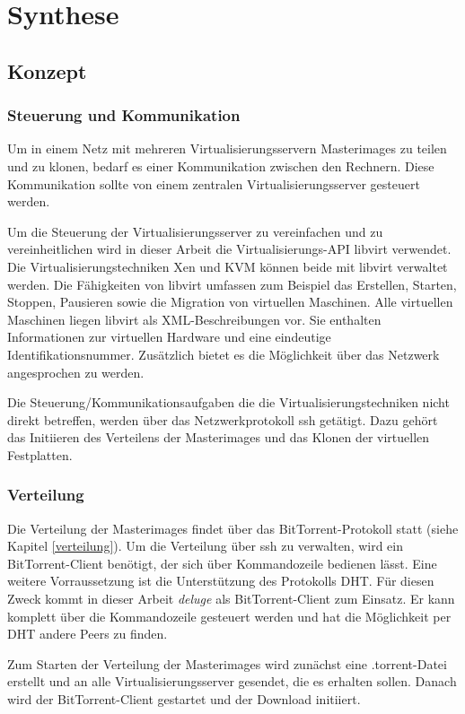 \chapter{Synthese}
\section{Konzept}
\subsection{Steuerung und Kommunikation}
Um in einem Netz mit mehreren Virtualisierungsservern Masterimages zu teilen und zu klonen, bedarf es einer Kommunikation zwischen den Rechnern. Diese Kommunikation sollte von einem zentralen Virtualisierungsserver gesteuert werden.

Um die Steuerung der Virtualisierungsserver zu vereinfachen und zu vereinheitlichen wird in dieser Arbeit die Virtualisierungs-API libvirt verwendet. Die Virtualisierungstechniken Xen und KVM können beide mit libvirt verwaltet werden. Die Fähigkeiten von libvirt umfassen zum Beispiel das Erstellen, Starten, Stoppen, Pausieren sowie die Migration von virtuellen Maschinen. Alle virtuellen Maschinen liegen libvirt als XML-Beschreibungen vor. Sie enthalten Informationen zur virtuellen Hardware und eine eindeutige Identifikationsnummer. Zusätzlich bietet es die Möglichkeit über das Netzwerk angesprochen zu werden.

Die Steuerung/Kommunikationsaufgaben die die Virtualisierungstechniken nicht direkt betreffen, werden über das Netzwerkprotokoll ssh getätigt. Dazu gehört das Initiieren des Verteilens der Masterimages und das Klonen der virtuellen Festplatten.

\subsection{Verteilung}
Die Verteilung der Masterimages findet über das BitTorrent-Protokoll statt (siehe Kapitel \ref{verteilung}). Um die Verteilung über ssh zu verwalten, wird ein BitTorrent-Client benötigt, der sich über Kommandozeile bedienen lässt. Eine weitere Vorraussetzung ist die Unterstützung des Protokolls DHT. Für diesen Zweck kommt in dieser Arbeit \textit{deluge} als BitTorrent-Client zum Einsatz. Er kann komplett über die Kommandozeile gesteuert werden und hat die Möglichkeit per DHT andere Peers zu finden.

Zum Starten der Verteilung der Masterimages wird zunächst eine .torrent-Datei erstellt und an alle Virtualisierungsserver gesendet, die es erhalten sollen. Danach wird der BitTorrent-Client gestartet und der Download initiiert.

